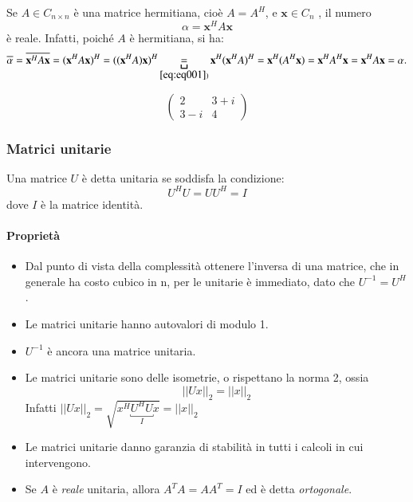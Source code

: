 \begin{property}

Se $A \in  C_{n \times n}$ \`e una matrice hermitiana,
 cio\`e $A = A^{H}$, e $\mathbf{x} \in C_n$ , il  numero 
$$ \alpha =  \mathbf{x}^{H} A \mathbf{x}$$
\`e reale. Infatti, poich\'e  $A$ \`e hermitiana, si ha:
$$\overline{\alpha}  = \overline{\mathbf{x}^{H} A\mathbf{x}} =
 (\mathbf{x}^H A\mathbf{x})^H = 
 ((\mathbf{x}^H A)\mathbf{x})^H \underbracket{=}_{\ref{eq:eq001})} 
 \mathbf{x}^{H}(\mathbf{x}^{H}A)^{H} = 
\mathbf{x}^{H}(A^{H}\mathbf{x})=
 \mathbf{x}^H A^{H} \mathbf{x} = \mathbf{x}^H A\mathbf{x}  = \alpha.$$
\end{property}

\begin{example}
$$\begin{pmatrix}
  2   & 3+i \\
  3-i & 4
\end{pmatrix}$$
\end{example}

\subsubsection{Matrici unitarie}
\begin{defn}
  Una matrice $U$ \`e detta unitaria se soddisfa la condizione:
  $$U^H U = U U^H = I$$
  dove $I$ \`e la matrice identità.
\end{defn}

\paragraph{Proprietà}
\label{prop:unitarie}
\begin{itemize}
\item Dal punto di vista della complessità ottenere l'inversa
  di una matrice, che in generale ha costo cubico in n, per le
  unitarie \`e immediato, dato che $ U^{-1} = U^{H} $.
\item Le matrici unitarie hanno autovalori di modulo 1.
\item $U^{-1}$ \`e ancora una matrice unitaria.
\item Le matrici unitarie sono delle isometrie, o rispettano la norma
  2, ossia
  $$||Ux||_{2} = ||x||_{2}$$ 
  Infatti $|| Ux ||_{2} = \sqrt{x^{H}\underbracket{U^{H}U}_{I}x} = ||x||_{2}$
\item Le matrici unitarie danno garanzia di stabilità in tutti i
  calcoli in cui intervengono.
\item Se $A$ \`e \emph{reale} unitaria, allora $A^{T}A = AA^{T} = I$ ed
  \`e detta \emph{ortogonale}.
\end{itemize}

